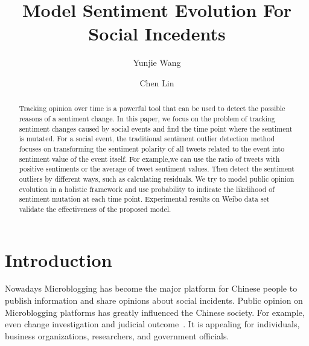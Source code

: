 \documentclass[runningheads]{llncs}
\begin{document}
\title{Model Sentiment Evolution For Social Incedents}
\author{Yunjie Wang \and Chen Lin}



\maketitle             

\begin{abstract}
Tracking opinion over time is a powerful tool that can be used to detect the possible reasons of a sentiment change. In this paper, we focus on the problem of tracking sentiment changes caused by social events and find the time point where the sentiment is mutated. For a social event, the traditional sentiment outlier detection method focuses on transforming the sentiment polarity of all tweets related to the event into sentiment value of the event itself. For example,we can use the ratio of tweets with positive sentiments or the average of tweet sentiment values. Then detect the sentiment outliers by different ways, such as calculating residuals. We try to model public opinion evolution in a holistic framework and use probability to indicate the likelihood of sentiment mutation at each time point. Experimental results on  Weibo data set validate the effectiveness of the proposed model.


\end{abstract}
%
%
%
\section{Introduction}
Nowadays Microblogging has become the major platform for Chinese people to publish information and share opinions about social incidents. Public opinion on Microblogging platforms has greatly influenced the Chinese society. 
For example, even change investigation and judicial outcome~\cite{}. %
It is appealing for individuals, business organizations, researchers, and government officials.%
\end{document}

